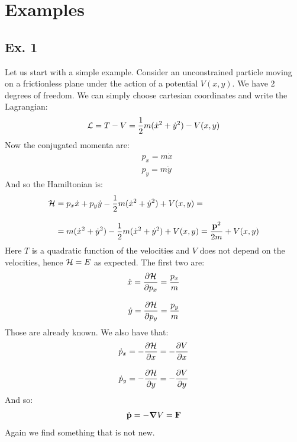 \section{Examples}
\subsection{Ex. 1}
Let us start with a simple example. Consider an unconstrained particle moving on a frictionless plane under the action of a potential $V(x,y)$. We have 2 degrees of freedom. We can simply choose cartesian coordinates and write the Lagrangian:
\begin{equation}
  \mathcal{L} = T - V = \dfrac{1}{2}m(\dot{x}^2+\dot{y}^2) - V(x,y)
\end{equation}
Now the conjugated momenta are:
\begin{equation}
  \begin{split}
    &p_x = m\dot{x} \\[8pt]
    &p_y = m\dot{y}
  \end{split}
\end{equation}
And so the Hamiltonian is:
\begin{equation}
  \begin{split}
    \mathcal{H} &= p_x\dot{x} + p_y\dot{y} - \dfrac{1}{2}m(\dot{x}^2+\dot{y}^2) + V(x,y) =\\[8pt]
    &= m(\dot{x}^2+\dot{y}^2) - \dfrac{1}{2}m(\dot{x}^2+\dot{y}^2) + V(x,y) = \dfrac{\vb{p}^2}{2m} + V(x,y)
  \end{split}
\end{equation}
Here $T$ is a quadratic function of the velocities and $V$ does not depend on the velocities, hence $\mathcal{H} = E$ as expected. The first two \hamiltonref\;are:
\begin{equation}
  \begin{split}
    \dot{x} = \pdv{\hamfun}{p_x} = \dfrac{p_x}{m} \\[8pt]
    \dot{y} = \pdv{\hamfun}{p_y} = \dfrac{p_y}{m}
  \end{split}
\end{equation}
Those are already known. We also have that:
\begin{equation}
  \begin{split}
    \dot{p}_x = -\pdv{\hamfun}{x} = -\pdv{V}{x} \\[8pt]
    \dot{p}_y = -\pdv{\hamfun}{y} = -\pdv{V}{y}
  \end{split}
\end{equation}
And so:
\begin{equation}
  \dot{\vb{p}} = -\grad{V} = \vb{F}
\end{equation}
Again we find something that is not new.\\
